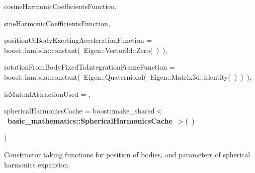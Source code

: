 {\begin{DoxyParamCaption}
\item[{const Coefficient\+Matrix\+Returning\+Function}]{cosine\+Harmonic\+Coefficients\+Function, }
\item[{const Coefficient\+Matrix\+Returning\+Function}]{sine\+Harmonic\+Coefficients\+Function, }
\item[{const {\bf State\+Function}}]{position\+Of\+Body\+Exerting\+Acceleration\+Function = {\ttfamily boost\+:\+:lambda\+:\+:constant(~Eigen\+:\+:Vector3d\+:\+:Zero(~)~)}, }
\item[{const boost\+::function$<$ Eigen\+::\+Quaterniond() $>$}]{rotation\+From\+Body\+Fixed\+To\+Integration\+Frame\+Function = {\ttfamily boost\+:\+:lambda\+:\+:constant(~Eigen\+:\+:Quaterniond(~Eigen\+:\+:Matrix3d\+:\+:Identity(~)~)~)}, }
\item[{const bool}]{is\+Mutual\+Attraction\+Used = {}, }
\item[{boost\+::shared\+\_\+ptr$<$ {\bf basic\+\_\+mathematics\+::\+Spherical\+Harmonics\+Cache} $>$}]{spherical\+Harmonics\+Cache = {\ttfamily boost\+:\+:make\+\_\+shared$<$~{\bf basic\+\_\+mathematics\+::\+Spherical\+Harmonics\+Cache}~$>$(~)}}
\end{DoxyParamCaption}
)\hspace{0.3cm}{\ttfamily [inline]}}\hypertarget{classtudat_1_1gravitation_1_1SphericalHarmonicsGravitationalAccelerationModel_ad222679658a992a85bf0c5dd7870b2a1}{}\label{classtudat_1_1gravitation_1_1SphericalHarmonicsGravitationalAccelerationModel_ad222679658a992a85bf0c5dd7870b2a1}
Constructor taking functions for position of bodies, and parameters of spherical harmonics expansion.

